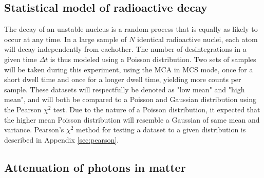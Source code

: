 \subsection{Statistical model of radioactive decay}
\label{sec:statistics}



The decay of an unstable nucleus is a random process that is equally as likely to occur at any time. 
In a large sample of \(N\) identical radioactive nuclei, each atom will decay independently from eachother. 
The number of desintegrations in a given time \(\Delta t\) is thus modeled using a Poisson distribution. Two sets of samples will be taken during this experiment, using the MCA in MCS mode, once for a short dwell time and once for a longer dwell time, yielding more counts per sample. These datasets will respectfully be denoted as "low mean" and "high mean", and will both be compared to a Poisson and Gaussian distribution using the Pearson \(\chi^2\) test. Due to the nature of a Poisson distribution, it expected that the higher mean Poisson distribution will resemble a Gaussian of same mean and variance. Pearson's \(\chi^2\) method for testing a dataset to a given distribution is described in Appendix \ref{sec:pearson}. 

\subsection{Attenuation of photons in matter}
\label{sec:attenuation}

